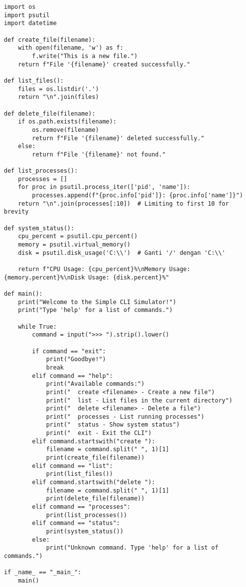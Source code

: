 \documentclass[12pt]{article}
\begin{document}
\begin{lstlisting}
import os
import psutil
import datetime

def create_file(filename):
    with open(filename, 'w') as f:
        f.write("This is a new file.")
    return f"File '{filename}' created successfully."

def list_files():
    files = os.listdir('.')
    return "\n".join(files)

def delete_file(filename):
    if os.path.exists(filename):
        os.remove(filename)
        return f"File '{filename}' deleted successfully."
    else:
        return f"File '{filename}' not found."

def list_processes():
    processes = []
    for proc in psutil.process_iter(['pid', 'name']):
        processes.append(f"{proc.info['pid']}: {proc.info['name']}")
    return "\n".join(processes[:10])  # Limiting to first 10 for brevity

def system_status():
    cpu_percent = psutil.cpu_percent()
    memory = psutil.virtual_memory()
    disk = psutil.disk_usage('C:\\')  # Ganti '/' dengan 'C:\\'
    
    return f"CPU Usage: {cpu_percent}%\nMemory Usage: {memory.percent}%\nDisk Usage: {disk.percent}%"

def main():
    print("Welcome to the Simple CLI Simulator!")
    print("Type 'help' for a list of commands.")
    
    while True:
        command = input(">>> ").strip().lower()
        
        if command == "exit":
            print("Goodbye!")
            break
        elif command == "help":
            print("Available commands:")
            print("  create <filename> - Create a new file")
            print("  list - List files in the current directory")
            print("  delete <filename> - Delete a file")
            print("  processes - List running processes")
            print("  status - Show system status")
            print("  exit - Exit the CLI")
        elif command.startswith("create "):
            filename = command.split(" ", 1)[1]
            print(create_file(filename))
        elif command == "list":
            print(list_files())
        elif command.startswith("delete "):
            filename = command.split(" ", 1)[1]
            print(delete_file(filename))
        elif command == "processes":
            print(list_processes())
        elif command == "status":
            print(system_status())
        else:
            print("Unknown command. Type 'help' for a list of commands.")

if _name_ == "_main_":
    main()
\end{lstlisting}
\end{document}
